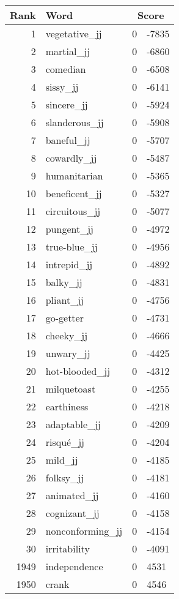 \begin{longtable}[!htbp]{| rlr@{.}l |}
    \hline
    \textbf{Rank} & \textbf{Word} & \multicolumn{2}{c|}{\textbf{Score}} \\
    \hline
    \endhead
    1 & vegetative\_jj & 0 & -7835 \\
    2 & martial\_jj & 0 & -6860 \\
    3 & comedian & 0 & -6508 \\
    4 & sissy\_jj & 0 & -6141 \\
    5 & sincere\_jj & 0 & -5924 \\
    6 & slanderous\_jj & 0 & -5908 \\
    7 & baneful\_jj & 0 & -5707 \\
    8 & cowardly\_jj & 0 & -5487 \\
    9 & humanitarian & 0 & -5365 \\
    10 & beneficent\_jj & 0 & -5327 \\
    11 & circuitous\_jj & 0 & -5077 \\
    12 & pungent\_jj & 0 & -4972 \\
    13 & true-blue\_jj & 0 & -4956 \\
    14 & intrepid\_jj & 0 & -4892 \\
    15 & balky\_jj & 0 & -4831 \\
    16 & pliant\_jj & 0 & -4756 \\
    17 & go-getter & 0 & -4731 \\
    18 & cheeky\_jj & 0 & -4666 \\
    19 & unwary\_jj & 0 & -4425 \\
    20 & hot-blooded\_jj & 0 & -4312 \\
    21 & milquetoast & 0 & -4255 \\
    22 & earthiness & 0 & -4218 \\
    23 & adaptable\_jj & 0 & -4209 \\
    24 & risqué\_jj & 0 & -4204 \\
    25 & mild\_jj & 0 & -4185 \\
    26 & folksy\_jj & 0 & -4181 \\
    27 & animated\_jj & 0 & -4160 \\
    28 & cognizant\_jj & 0 & -4158 \\
    29 & nonconforming\_jj & 0 & -4154 \\
    30 & irritability & 0 & -4091 \\
    1949 & independence & 0 & 4531 \\
    1950 & crank & 0 & 4546 \\

\end{longtable}
